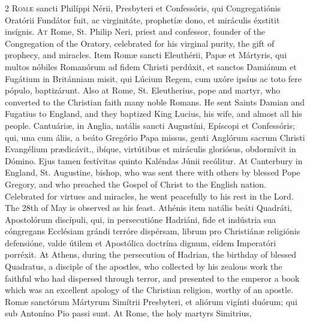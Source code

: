 \begin{paracol}{2}
\lettrine[lines=2]{R}{omæ} sancti Philíppi 
 Nérii, Presbyteri et Confessóris, qui Congregatiónis Oratórii Fundátor fuit, 
 ac virginitáte, prophetíæ dono, et miráculis éxstitit insígnis.
\switchcolumn
{}
\lettrine[lines=2]{A}{t} Rome, St. Philip Neri, priest and 
 confessor, founder of the Congregation of the Oratory, celebrated for his 
 virginal purity, the gift of prophecy, and miracles.
\switchcolumn*
{}
Item Romæ sancti 
 Eleuthérii, Papæ et Mártyris, qui multos nóbiles Romanórum ad fidem Christi 
 perdúxit, et sanctos Damiánum et Fugátium in Británniam misit, qui Lúcium 
 Regem, cum uxóre ipsíus ac toto fere pópulo, baptizárunt.
\switchcolumn
{}
Also at Rome, St. Eleutherius, pope 
 and martyr, who converted to the Christian faith many noble Romans. He 
 sent Saints Damian and Fugatius to England, and they baptized King Lucius, 
 his wife, and almost all his people.
\switchcolumn*
{}
Cantuáriæ, in Anglia, 
 natális sancti Augustíni, Epíscopi et Confessóris; qui, una cum áliis, a 
 beáto Gregório Papa missus, genti Anglórum sacrum Christi Evangélium 
 prædicávit., ibíque, virtútibus et miráculis gloriósus, obdormívit in 
 Dómino. Ejus tamen festívitas quinto Kaléndas Júnii recólitur.
\switchcolumn
{}
At Canterbury in England, St. 
 Augustine, bishop, who was sent there with others by blessed Pope Gregory, 
 and who preached the Gospel of Christ to the English nation. 
 Celebrated for virtues and miracles, he went peacefully to his rest in the 
 Lord. The 28th of May is observed as his feast.
\switchcolumn*
{}
Athénis item natális 
 beáti Quadráti, Apostolórum discípuli, qui, in persecutióne Hadriáni, fide 
 et indústria sua cóngregans Ecclésiam grándi terróre dispérsam, librum pro 
 Christiánæ religiónis defensióne, valde 
 útilem et Apostólica doctrína dignum, 
 eídem Imperatóri porréxit.
\switchcolumn
{}
At Athens, during the persecution 
 of Hadrian, the birthday of blessed Quadratus, a disciple of the apostles, 
 who collected by his zealous work the faithful who had dispersed through 
 terror, and presented to the emperor a book which was an excellent apology 
 of the Christian religion, worthy of an apostle.
\switchcolumn*
{}
Romæ sanctórum 
 Mártyrum Simítrii Presbyteri, et aliórum vigínti duórum; qui sub Antoníno 
 Pio passi sunt.
\switchcolumn
{}
At Rome, the holy martyrs Simitrius, 

\end{paracol}
